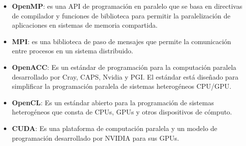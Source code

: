 \begin{itemize}
  \item \textbf{OpenMP}: es una API de programación en paralelo que se basa en directivas de compilador y funciones de
    biblioteca para permitir la paralelización de aplicaciones en sistemas de memoria compartida.
  \item \textbf{MPI}: es una biblioteca de paso de mensajes que permite la comunicación entre procesos en un sistema
    distribuido.
  \item \textbf{OpenACC}: Es un estándar de programación para la computación paralela desarrollado por Cray, CAPS,
    Nvidia y PGI. El estándar está diseñado para simplificar la programación paralela de sistemas heterogéneos CPU/GPU.
  \item \textbf{OpenCL}: Es un estándar abierto para la programación de sistemas heterogéneos que consta de CPUs, GPUs y
    otros dispositivos de cómputo.
  \item \textbf{CUDA}: Es una plataforma de computación paralela y un modelo de programación desarrollado por NVIDIA para
    sus GPUs.
\end{itemize}




